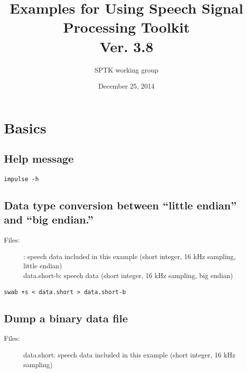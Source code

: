 \documentclass[a4paper,10pt]{article}
\title{
  Examples for Using Speech Signal Processing Toolkit\\
  Ver. 3.8}
\author{SPTK working group}
\date{December 25, 2014}
\begin{document}
\maketitle

\tableofcontents

\newpage

\section{Basics}

\subsection{Help message}

\begin{verbatim}
impulse -h
\end{verbatim}

\subsection{Data type conversion between ``little endian'' and ``big endian.''}

\begin{description}
\item[Files:]
  :
           speech data included in this example (short integer, 16 kHz sampling, little endian)\\
  data.short-b: speech data (short integer, 16 kHz sampling, big endian)
\end{description}
 
\begin{verbatim}
swab +s < data.short > data.short-b
\end{verbatim}

\subsection{Dump a binary data file}

\begin{description}
\item[Files:]
  data.short: speech data included in this example (short integer, 16 kHz sampling)
\end{description}
\end{document}
